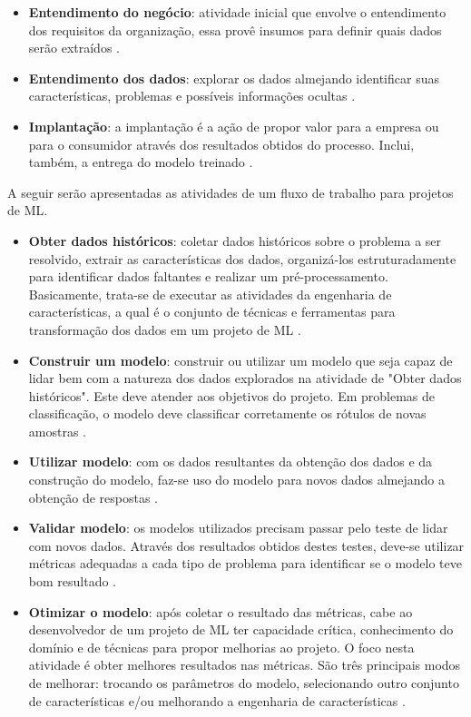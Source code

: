 \begin{itemize}
	\item \textbf{Entendimento do negócio}: atividade inicial que envolve o entendimento dos requisitos da organização, essa provê insumos para definir quais dados serão extraídos \cite{chapman_crisp-dm_2000}. 
    \item \textbf{Entendimento dos dados}: explorar os dados almejando identificar suas características, problemas e possíveis informações ocultas \cite{chapman_crisp-dm_2000}.
    \item \textbf{Implantação}: a implantação é a ação de propor valor para a empresa ou para o consumidor através dos resultados obtidos do processo. Inclui, também, a entrega do modelo treinado \cite{chapman_crisp-dm_2000}.
\end{itemize}

A seguir serão apresentadas as atividades de um fluxo de trabalho para projetos de ML.

\begin{itemize}
	\item \textbf{Obter dados históricos}: coletar dados históricos sobre o problema a ser resolvido, extrair as características dos dados, organizá-los estruturadamente para identificar dados faltantes e realizar um pré-processamento. Basicamente, trata-se de executar as atividades da engenharia de características, a qual é o conjunto de técnicas e ferramentas para transformação dos dados em um projeto de ML \cite{brink_real-world_2015}.
    \item \textbf{Construir um modelo}: construir ou utilizar um modelo que seja capaz de lidar bem com a natureza dos dados explorados na atividade de "Obter dados históricos". Este deve atender aos objetivos do projeto. Em problemas de classificação, o modelo deve classificar corretamente os rótulos de novas amostras \cite{brink_real-world_2015}.
    \item \textbf{Utilizar modelo}: com os dados resultantes da obtenção dos dados e da construção do modelo, faz-se uso do modelo para novos dados almejando a obtenção de respostas \cite{brink_real-world_2015}.
    \item \textbf{Validar modelo}: os modelos utilizados precisam passar pelo teste de lidar com novos dados. Através dos resultados obtidos destes testes, deve-se utilizar métricas adequadas a cada tipo de problema para identificar se o modelo teve bom resultado \cite{brink_real-world_2015}.
    \item \textbf{Otimizar o modelo}: após coletar o resultado das métricas, cabe ao desenvolvedor de um projeto de ML ter capacidade crítica, conhecimento do domínio e de técnicas para propor melhorias ao projeto. O foco nesta atividade é obter melhores resultados nas métricas. São três principais modos de melhorar: trocando os parâmetros do modelo, selecionando outro conjunto de características e/ou melhorando a engenharia de características \cite{brink_real-world_2015}.
\end{itemize}

